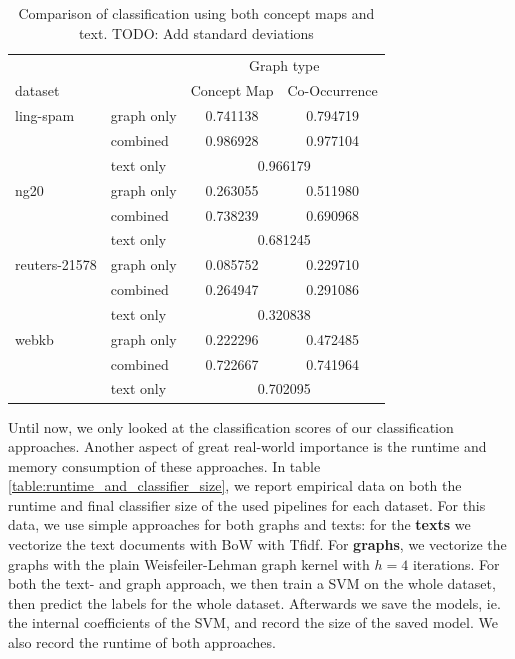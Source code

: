 

\begin{table}[htb!]
\centering
\begin{tabular}{llcc}
  &  & \multicolumn{2}{c}{Graph type} \\
   dataset   & &  Concept Map &  Co-Occurrence \\
\midrule
ling-spam 
          & graph only &  0.741138 &  0.794719\\
          & combined &  0.986928 &  0.977104\\
          & text only & \multicolumn{2}{c}{ 0.966179 }\\
\midrule
ng20 
          & graph only &  0.263055 &  0.511980\\
          & combined &  0.738239 &  0.690968\\
          & text only & \multicolumn{2}{c}{ 0.681245 }\\
\midrule
reuters-21578 
          & graph only &  0.085752 &  0.229710\\
          & combined &  0.264947 &  0.291086\\
          & text only & \multicolumn{2}{c}{ 0.320838 }\\
\midrule
webkb 
          & graph only &  0.222296 &  0.472485\\
          & combined &  0.722667 &  0.741964\\
          & text only & \multicolumn{2}{c}{ 0.702095 }\\	
\bottomrule
\end{tabular}
\caption[Results: Combined text- and graph features]{Comparison of classification using both concept maps and text. TODO: Add standard deviations}%
\label{table:results_comparison_combined}
\end{table}


Until now, we only looked at the classification scores of our classification approaches.
Another aspect of great real-world importance is the runtime and memory consumption of these approaches.
In table \ref{table:runtime_and_classifier_size}, we report empirical data on both the runtime and final classifier size of the used pipelines for each dataset.
For this data, we use simple approaches for both graphs and texts: for the \textbf{texts} we vectorize the text documents with BoW with Tfidf.
For \textbf{graphs}, we vectorize the graphs with the plain Weisfeiler-Lehman graph kernel with $h = 4$ iterations.
For both the text- and graph approach, we then train a SVM on the whole dataset, then predict the labels for the whole dataset. Afterwards we save the models, ie. the internal coefficients of the SVM, and record the size of the saved model.
We also record the runtime of both approaches.

